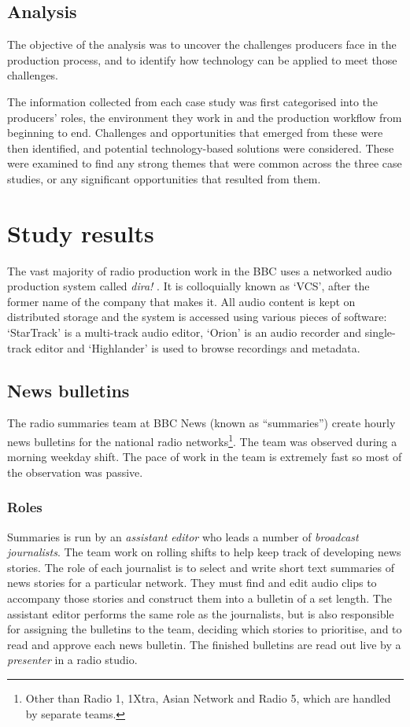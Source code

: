 \subsection{Analysis}
The objective of the analysis was to uncover the challenges producers face in the production process, and to identify
how technology can be applied to meet those challenges.

The information collected from each case study was first categorised into the producers' roles, the environment they
work in and the production workflow from beginning to end. Challenges and opportunities that emerged from these were
then identified, and potential technology-based solutions were considered.  These were examined to find any strong
themes that were common across the three case studies, or any significant opportunities that resulted from them.

\section{Study results}\label{sec:ethno-results}

The vast majority of radio production work in the BBC uses a networked audio production system called \textit{dira!}
\citep{SCISYS2015}. It is colloquially known as `VCS', after the former name of the company that makes it. All audio
content is kept on distributed storage and the system is accessed using various pieces of software: `StarTrack' is a
multi-track audio editor, `Orion' is an audio recorder and single-track editor and `Highlander' is used to browse
recordings and metadata. 

\subsection{News bulletins}\label{sec:news}
The radio summaries team at BBC News (known as ``summaries'') create hourly news bulletins for the national radio
networks\footnote{Other than Radio 1, 1Xtra, Asian Network and Radio 5, which are handled by separate teams.}. The team
was observed during a morning weekday shift. The pace of work in the team is extremely fast so most of the observation
was passive.

\subsubsection{Roles}\label{sec:news-roles}
Summaries is run by an \textit{assistant editor} who leads a number of \textit{broadcast journalists}. The team work on
rolling shifts to help keep track of developing news stories. The role of each journalist is to select and write short
text summaries of news stories for a particular network. They must find and edit audio clips to accompany those stories
and construct them into a bulletin of a set length.  The assistant editor performs the same role as the journalists,
but is also responsible for assigning the bulletins to the team, deciding which stories to prioritise, and to read and
approve each news bulletin. The finished bulletins are read out live by a \textit{presenter} in a radio studio.


